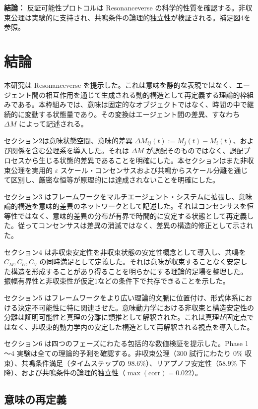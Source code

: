 \documentclass[11pt,a4paper]{article}
\theoremstyle{definition}
\begin{document}
\textbf{結論：} 反証可能性プロトコルは Resonanceverse の科学的性質を確認する。非収束公理は実験的に支持され、共鳴条件の論理的独立性が検証される。補足図4を参照。

\section{結論}

本研究は Resonanceverse を提示した。これは意味を静的な表現ではなく、エージェント間の相互作用を通じて生成される動的構造として再定義する理論的枠組みである。本枠組みでは、意味は固定的なオブジェクトではなく、時間の中で継続的に変動する状態量であり。その変換はエージェント間の差異、すなわち $\Delta M$ によって記述される。

セクション2は意味状態空間、意味的差異 $\Delta M_{ij}(t) := M_j(t) - M_i(t)$、および関係を含む公理系を導入した。それは $\Delta M$ が誤配そのものではなく、誤配プロセスから生じる状態的差異であることを明確にした。本セクションはまた非収束公理を実用的 $\varepsilon$ スケール・コンセンサスおよび共鳴からスケール分離を通じて区別し、厳密な恒等が原理的には達成されないことを明確にした。

セクション3 はフレームワークをマルチエージェント・システムに拡張し、意味論的構造を意味的差異のネットワークとして記述した。それはコンセンサスを恒等性ではなく、意味的差異の分布が有界で時間的に安定する状態として再定義した。従ってコンセンサスは差異の消滅ではなく、差異の構造的修正として示された。

セクション4 は非収束安定性を非収束状態の安定性概念として導入し、共鳴を $C_M, C_U, C_V$ の同時満足として定義した。それは意味が収束することなく安定した構造を形成することがあり得ることを明らかにする理論的足場を整理した。振幅有界性と非収束性が仮定1などの条件下で共存できることを示した。

セクション5 はフレームワークをより広い理論的文脈に位置付け、形式体系における決定不可能性に特に関連させた。意味動力学における非収束と構造安定性の分離は証明可能性と真理の分離に類推として解釈された。これは真理が固定点ではなく、非収束的動力学内の安定した構造として再解釈される視点を導入した。

セクション6 は四つのフェーズにわたる包括的な数値検証を提示した。Phase 1～4 実験は全ての理論的予測を確認する。非収束公理（300 試行にわたり 0\% 収束）、共鳴条件満足（タイムステップの 98.6\%）、リアプノフ安定性（58.9\% 下降）、および共鳴条件の論理的独立性（$\max(\text{corr}) = 0.022$）。

\subsection{意味の再定義}
\end{document}
